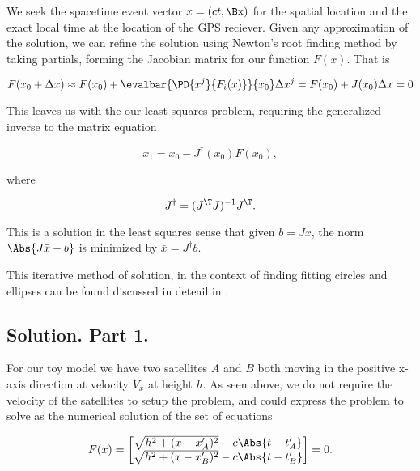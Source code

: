 We seek the spacetime event vector $x = (c t, \Bx)$ for the spatial location and the exact local time at the location of the GPS reciever.  Given any approximation of the solution, we can refine the solution using Newton's root finding method by taking partials, forming the Jacobian matrix for our function $F(x)$.  That is

\begin{equation}\label{eqn:relativisticElectrodynamicsA1:320}
F(x_0 + \Delta x) \approx F(x_0) + \evalbar{\PD{x^j}{F_i(x)}}{x_0} \Delta x^j = F(x_0) + J(x_0) \Delta x = 0
\end{equation}

This leaves us with the our least squares problem, requiring the generalized inverse to the matrix equation

\begin{equation}\label{eqn:relativisticElectrodynamicsA1:330}
x_1 = x_0 - J^\dagger (x_0) F(x_0),
\end{equation}

where 

\begin{equation}\label{eqn:relativisticElectrodynamicsA1:340}
J^\dagger = (J^\T J)^{-1} J^\T.
\end{equation}

This is a solution in the least squares sense that given $b = J x$, the norm $\Abs{ J \bar{x} - b}$ is minimized by $\bar{x} = J^\dagger b$.

This iterative method of solution, in the context of finding fitting circles and ellipses can be found discussed in deteail in \cite{gander1994least}.

\subsection{Solution. Part 1.}

For our toy model we have two satellites $A$ and $B$ both moving in the positive x-axis direction at velocity $V_x$ at height $h$.  As seen above, we do not require the velocity of the satellites to setup the problem, and could express the problem to solve as the numerical solution of the set of equations

\begin{equation}\label{eqn:relativisticElectrodynamicsA1:350}
F(x) = 
\begin{bmatrix}
\sqrt{ h^2 + (x - x_A')^2 } - c \Abs{t - t_A'} \\
\sqrt{ h^2 + (x - x_B')^2 } - c \Abs{t - t_B'} \\
\end{bmatrix} = 0.
\end{equation}

